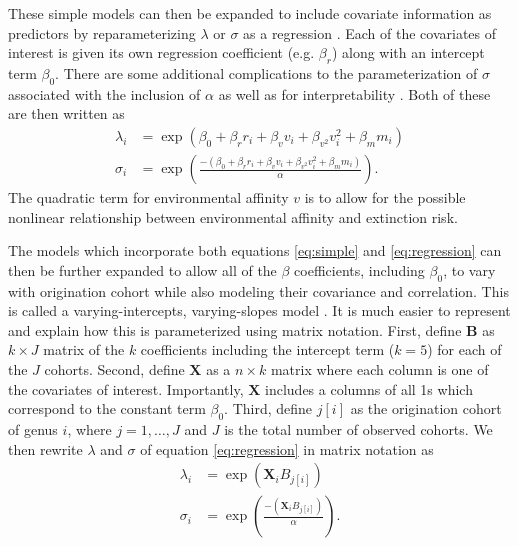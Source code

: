 \documentclass[12pt,letterpaper]{article}
\begin{document}
These simple models can then be expanded to include covariate information as predictors by reparameterizing \(\lambda\) or \(\sigma\) as a regression \citep{Klein2003}. Each of the covariates of interest is given its own regression coefficient (e.g. \(\beta_{r}\)) along with an intercept term \(\beta_{0}\). There are some additional complications to the parameterization of \(\sigma\) associated with the inclusion of \(\alpha\) as well as for interpretability \citep{Klein2003}. Both of these are then written as
\begin{equation}
  \begin{aligned}
    \lambda_{i} &= \exp(\beta_{0} + \beta_{r} r_{i} + \beta_{v} v_{i} + \beta_{v^{2}} v_{i}^{2} + \beta_{m} m_{i}) \\
    \sigma_{i} &= \exp\left(\frac{-(\beta_{0} + \beta_{r} r_{i} + \beta_{v} v_{i} + \beta_{v^{2}} v_{i}^{2} + \beta_{m} m_{i})}{\alpha}\right).
  \end{aligned}
  \label{eq:regression}
\end{equation}
The quadratic term for environmental affinity \(v\) is to allow for the possible nonlinear relationship between environmental affinity and extinction risk.

The models which incorporate both equations \ref{eq:simple} and \ref{eq:regression} can then be further expanded to allow all of the \(\beta\) coefficients, including \(\beta_{0}\), to vary with origination cohort while also modeling their covariance and correlation. This is called a varying-intercepts, varying-slopes model \citep{Gelman2007}. It is much easier to represent and explain how this is parameterized using matrix notation. First, define \(\mathbf{B}\) as \(k \times J\) matrix of the \(k\) coefficients including the intercept term (\(k = 5\)) for each of the \(J\) cohorts. Second, define \(\mathbf{X}\) as a \(n \times k\) matrix where each column is one of the covariates of interest. Importantly, \(\mathbf{X}\) includes a columns of all 1s which correspond to the constant term \(\beta_{0}\). Third, define \(j[i]\) as the origination cohort of genus \(i\), where \(j = 1, \dots, J\) and \(J\) is the total number of observed cohorts. We then rewrite \(\lambda\) and \(\sigma\) of equation \ref{eq:regression} in matrix notation as
\begin{equation}
  \begin{aligned}
    \lambda_{i} &= \exp(\mathbf{X}_{i} B_{j[i]}) \\
    \sigma_{i} &= \exp\left(\frac{-(\mathbf{X}_{i} B_{j[i]})}{\alpha}\right). 
  \end{aligned}
  \label{eq:multivariate}
\end{equation}
\end{document}

